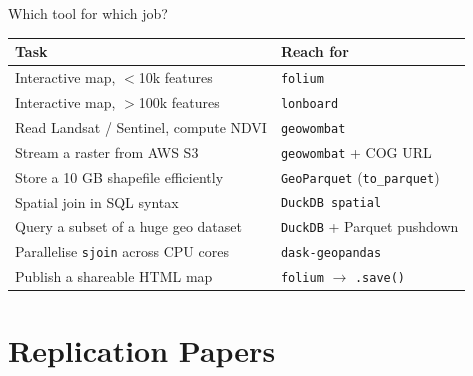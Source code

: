 \documentclass[10pt,aspectratio=169]{beamer}
\begin{document}
\begin{frame}{Which tool for which job?}
  \centering
  \small
  \begin{tabular}{@{}p{4.8cm}p{7.5cm}@{}}
    \toprule
    \textbf{Task}                                  & \textbf{Reach for} \\
    \midrule
    Interactive map, $<$10k features               & \texttt{folium} \\
    Interactive map, $>$100k features              & \texttt{lonboard} \\
    Read Landsat / Sentinel, compute NDVI          & \texttt{geowombat} \\
    Stream a raster from AWS S3                    & \texttt{geowombat} + COG URL \\
    Store a 10 GB shapefile efficiently            & \texttt{GeoParquet} (\texttt{to\_parquet}) \\
    Spatial join in SQL syntax                     & \texttt{DuckDB spatial} \\
    Query a subset of a huge geo dataset           & \texttt{DuckDB} + Parquet pushdown \\
    Parallelise \texttt{sjoin} across CPU cores    & \texttt{dask-geopandas} \\
    Publish a shareable HTML map                   & \texttt{folium} $\rightarrow$ \texttt{.save()} \\
    \bottomrule
  \end{tabular}
\end{frame}

\section{Replication Papers}
\end{document}
